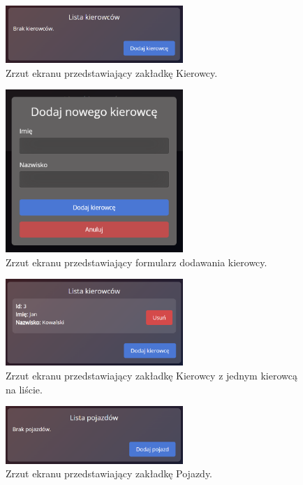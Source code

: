 \begin{figure}
	\centering
	\includegraphics[width=0.6\textwidth]{./graf/driver_tab.png}
	\caption{Zrzut ekranu przedstawiający zakładkę Kierowcy.}
	\label{fig:4.5}
\end{figure}

\begin{figure}
	\centering
	\includegraphics[width=0.6\textwidth]{./graf/add_driver.png}
	\caption{Zrzut ekranu przedstawiający formularz dodawania kierowcy.}
	\label{fig:4.6}
\end{figure}

\begin{figure}
	\centering
	\includegraphics[width=0.6\textwidth]{./graf/driver_tab_2.png}
	\caption{Zrzut ekranu przedstawiający zakładkę Kierowcy z jednym kierowcą na liście.}
	\label{fig:4.7}
\end{figure}

\begin{figure}
	\centering
	\includegraphics[width=0.6\textwidth]{./graf/vehicle_tab.png}
	\caption{Zrzut ekranu przedstawiający zakładkę Pojazdy.}
	\label{fig:4.8}
\end{figure}

